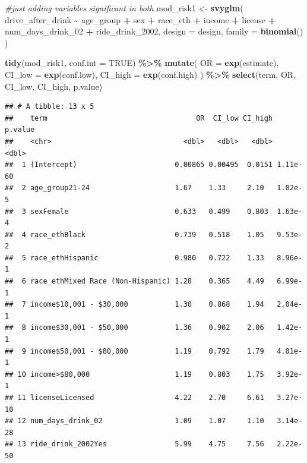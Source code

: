 \documentclass[
]{article}
\newenvironment{Shaded}{\begin{snugshade}}{\end{snugshade}}
\newcommand{\AttributeTok}[1]{\textcolor[rgb]{0.13,0.29,0.53}{#1}}
\newcommand{\CommentTok}[1]{\textcolor[rgb]{0.56,0.35,0.01}{\textit{#1}}}
\newcommand{\ConstantTok}[1]{\textcolor[rgb]{0.56,0.35,0.01}{#1}}
\newcommand{\FunctionTok}[1]{\textcolor[rgb]{0.13,0.29,0.53}{\textbf{#1}}}
\newcommand{\NormalTok}[1]{#1}
\newcommand{\OtherTok}[1]{\textcolor[rgb]{0.56,0.35,0.01}{#1}}
\newcommand{\SpecialCharTok}[1]{\textcolor[rgb]{0.81,0.36,0.00}{\textbf{#1}}}
\begin{document}
\begin{Shaded}
\begin{Highlighting}[]
\CommentTok{\#just adding variables significant in both}
\NormalTok{mod\_risk1 }\OtherTok{\textless{}{-}} \FunctionTok{svyglm}\NormalTok{(}
\NormalTok{  drive\_after\_drink }\SpecialCharTok{\textasciitilde{}}\NormalTok{ age\_group }\SpecialCharTok{+}\NormalTok{ sex }\SpecialCharTok{+}\NormalTok{ race\_eth }\SpecialCharTok{+}\NormalTok{ income }\SpecialCharTok{+} 
\NormalTok{    license }\SpecialCharTok{+}\NormalTok{ num\_days\_drink\_02 }\SpecialCharTok{+}\NormalTok{ ride\_drink\_2002,}
  \AttributeTok{design =}\NormalTok{ design,}
  \AttributeTok{family =} \FunctionTok{binomial}\NormalTok{()}
\NormalTok{) }

\FunctionTok{tidy}\NormalTok{(mod\_risk1, }\AttributeTok{conf.int =} \ConstantTok{TRUE}\NormalTok{) }\SpecialCharTok{\%\textgreater{}\%}
  \FunctionTok{mutate}\NormalTok{(}
    \AttributeTok{OR =} \FunctionTok{exp}\NormalTok{(estimate),}
    \AttributeTok{CI\_low =} \FunctionTok{exp}\NormalTok{(conf.low),}
    \AttributeTok{CI\_high =} \FunctionTok{exp}\NormalTok{(conf.high)}
\NormalTok{  ) }\SpecialCharTok{\%\textgreater{}\%}
  \FunctionTok{select}\NormalTok{(term, OR, CI\_low, CI\_high, p.value)}
\end{Highlighting}
\end{Shaded}

\begin{verbatim}
## # A tibble: 13 x 5
##    term                                   OR  CI_low CI_high  p.value
##    <chr>                               <dbl>   <dbl>   <dbl>    <dbl>
##  1 (Intercept)                       0.00865 0.00495  0.0151 1.11e-60
##  2 age_group21-24                    1.67    1.33     2.10   1.02e- 5
##  3 sexFemale                         0.633   0.499    0.803  1.63e- 4
##  4 race_ethBlack                     0.739   0.518    1.05   9.53e- 2
##  5 race_ethHispanic                  0.980   0.722    1.33   8.96e- 1
##  6 race_ethMixed Race (Non-Hispanic) 1.28    0.365    4.49   6.99e- 1
##  7 income$10,001 - $30,000           1.30    0.868    1.94   2.04e- 1
##  8 income$30,001 - $50,000           1.36    0.902    2.06   1.42e- 1
##  9 income$50,001 - $80,000           1.19    0.792    1.79   4.01e- 1
## 10 income>$80,000                    1.19    0.803    1.75   3.92e- 1
## 11 licenseLicensed                   4.22    2.70     6.61   3.27e-10
## 12 num_days_drink_02                 1.09    1.07     1.10   3.14e-28
## 13 ride_drink_2002Yes                5.99    4.75     7.56   2.22e-50
\end{verbatim}
\end{document}
